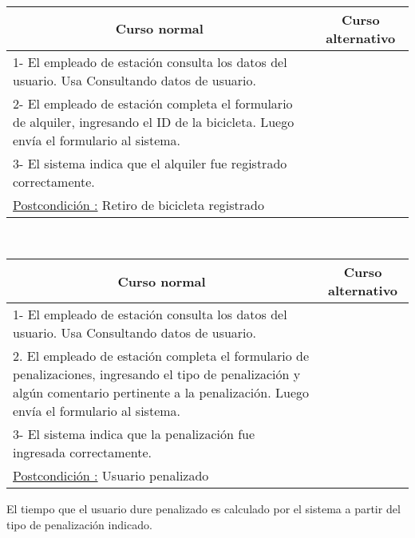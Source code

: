 ~

\begin{center}
    \centering
    \begin{tabular}{ | p{11cm} | p{6cm} | }
    	\multicolumn{1}{c}{\cellcolor{black!30}\textbf{Curso normal}} & 
    	\multicolumn{1}{c}{\cellcolor{black!30}\textbf{Curso alternativo}} \\
		\hline
		1- El empleado de estación consulta los datos del usuario. Usa Consultando datos de usuario. &  \\ \hline
		2- El empleado de estación completa el formulario de alquiler, ingresando el ID de la bicicleta. Luego envía el formulario al sistema. & \\ \hline
		3- El sistema indica que el alquiler fue registrado correctamente. & \\ \hline
		\underline{Postcondición :} Retiro de bicicleta registrado & \\ \hline
    \end{tabular}
\end{center}

~

\begin{center}
    \centering
    \begin{tabular}{ | p{11cm} | p{6cm} | }
    	\multicolumn{1}{c}{\cellcolor{black!30}\textbf{Curso normal}} & 
    	\multicolumn{1}{c}{\cellcolor{black!30}\textbf{Curso alternativo}} \\
		\hline
		1- El empleado de estación consulta los datos del usuario. Usa Consultando datos de usuario. &  \\ \hline
		2. El empleado de estación completa el formulario de penalizaciones, ingresando el tipo de penalización y algún comentario pertinente a la penalización. Luego envía el formulario al sistema. & \\ \hline
		3- El sistema indica que la penalización fue ingresada correctamente. & \\ \hline
		\underline{Postcondición :} Usuario penalizado & \\ \hline
    \end{tabular}
\end{center}

El tiempo que el usuario dure penalizado es calculado por el sistema a partir del tipo de penalización indicado.

~

